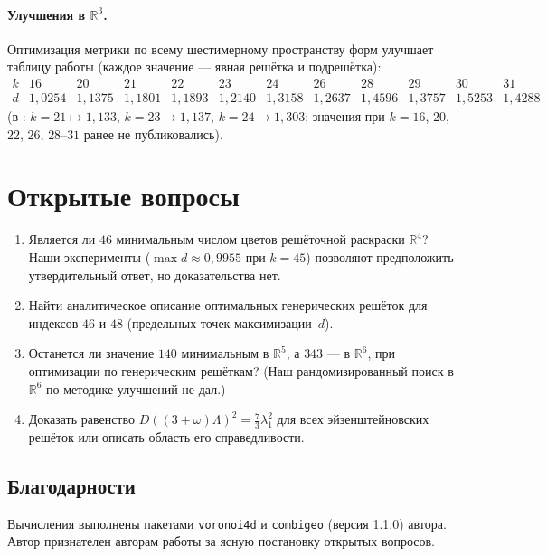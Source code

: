 \documentclass[12pt]{article}
\theoremstyle{definition}
\theoremstyle{remark}
\newcommand{\R}{\mathbb{R}}
\begin{document}
\paragraph{Улучшения в $\R^3$.} Оптимизация метрики по всему шестимерному
пространству форм улучшает таблицу работы \cite{Ivanov2011} (каждое значение
--- явная решётка и подрешётка):
\[
\begin{array}{c|ccccccccccc}
k & 16 & 20 & 21 & 22 & 23 & 24 & 26 & 28 & 29 & 30 & 31\\
\hline
d & 1{,}0254 & 1{,}1375 & 1{,}1801 & 1{,}1893 & 1{,}2140 & 1{,}3158 &
1{,}2637 & 1{,}4596 & 1{,}3757 & 1{,}5253 & 1{,}4288
\end{array}
\]
(в \cite{Ivanov2011}: $k=21\mapsto1{,}133$, $k=23\mapsto1{,}137$,
$k=24\mapsto1{,}303$; значения при $k=16$, $20$, $22$, $26$, $28$--$31$ ранее
не публиковались).

\section{Открытые вопросы}

\begin{enumerate}
\item Является ли $46$ минимальным числом цветов решёточной раскраски $\R^4$?
Наши эксперименты ($\max d\approx0{,}9955$ при $k=45$) позволяют предположить
утвердительный ответ, но доказательства нет.
\item Найти аналитическое описание оптимальных генерических решёток для
индексов $46$ и $48$ (предельных точек максимизации~$d$).
\item Останется ли значение $140$ минимальным в $\R^5$, а $343$ --- в $\R^6$,
при оптимизации по генерическим решёткам? (Наш рандомизированный поиск в
$\R^6$ по методике \cite{ABPR} улучшений не дал.)
\item Доказать равенство $D((3+\omega)\Lambda)^2=\tfrac73\lambda_1^2$ для всех
эйзенштейновских решёток или описать область его справедливости.
\end{enumerate}

\subsection*{Благодарности}
Вычисления выполнены пакетами \texttt{voronoi4d} и \texttt{combigeo} (версия
1.1.0) автора. Автор признателен авторам работы \cite{ABPR} за ясную
постановку открытых вопросов.
\end{document}
